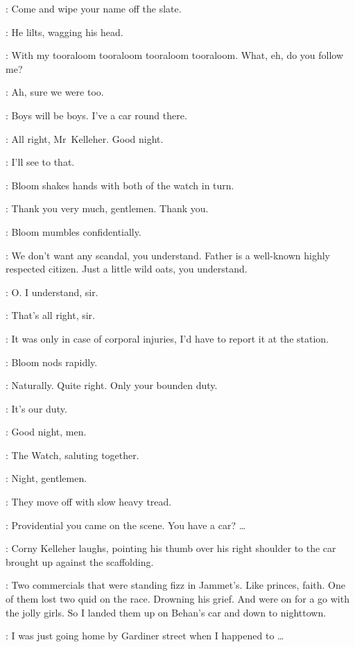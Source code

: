 \Corny:
Come and wipe your name off the slate.

:
He lilts, wagging his head.

\Corny:
With my tooraloom tooraloom tooraloom tooraloom.
What, eh, do you follow me?

\SecondWatch:
Ah, sure we were too.

\Corny:
Boys will be boys.
I've a car round there.

\SecondWatch:
All right, Mr~Kelleher.
Good night.

\Corny:
I'll see to that.

:
Bloom shakes hands with both of the watch in turn.

\Bloom:
Thank you very much, gentlemen.
Thank you.

:
Bloom mumbles confidentially.

\Bloom:
We don't want any scandal, you understand.
Father is a well-known highly respected citizen.
Just a little wild oats, you understand.

\FirstWatch:
O. I understand, sir.

\SecondWatch:
That's all right, sir.

\FirstWatch:
It was only in case of corporal injuries,
I'd have to report it at the station.

:
Bloom nods rapidly.

\Bloom:
Naturally.
Quite right.
Only your bounden duty.

\SecondWatch:
It's our duty.

\Corny:
Good night, men.

:
The Watch, saluting together.

\Watch:
Night, gentlemen.

:
They move off with slow heavy tread.

\Bloom:
Providential you came on the scene.
You have a car? \ldots

:
Corny Kelleher laughs, pointing his thumb over his right shoulder
to the car brought up against the scaffolding.

\Corny:
Two commercials that were standing fizz in Jammet's.
Like princes, faith.
One of them lost two quid on the race.
Drowning his grief.
And were on for a go with the jolly girls.
So I landed them up on Behan's car and down to nighttown.

\Bloom:
I was just going home by Gardiner street when I happened to \ldots

